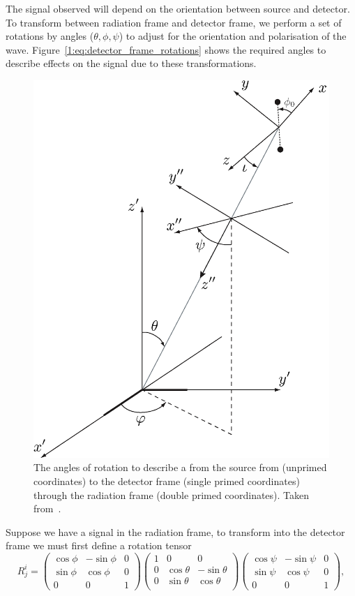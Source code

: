 The \gw signal observed will depend on the orientation between source and detector. To transform between radiation frame and detector frame, we perform a set of rotations by angles ($\theta, \phi, \psi$) to adjust for the orientation and polarisation of the wave. Figure~\ref{1:eq:detector_frame_rotations} shows the required angles to describe effects on the \gwadj signal due to these transformations.
%
\begin{figure}
    \centering
    \includegraphics[width=0.75\linewidth]{images/1_general_relativity/gravitational_wave_detection/euler.png}
    \caption{The angles of rotation to describe a \gw from the source from (unprimed coordinates) to the detector frame (single primed coordinates) through the radiation frame (double primed coordinates). Taken from~\cite{Brown_Thesis:2004}.}
    \label{1:fig:source_to_detector_frame}
\end{figure}
%
Suppose we have a \gwadj signal in the radiation frame, to transform into the detector frame we must first define a rotation tensor
%
\begin{equation}
    R^{i}_{j} = 
    \begin{pmatrix}
        \cos\phi & -\sin\phi & 0 \\
        \sin\phi &  \cos\phi & 0 \\
        0        &  0        & 1
    \end{pmatrix}
    \begin{pmatrix}
        1 & 0 & 0 \\
        0 & \cos\theta & -\sin\theta \\
        0 & \sin\theta & \cos\theta \\
    \end{pmatrix}
    \begin{pmatrix}
        \cos\psi & -\sin\psi & 0 \\
        \sin\psi &  \cos\psi & 0 \\
        0        &  0        & 1
    \end{pmatrix},
    \label{1:eq:detector_frame_rotations}
\end{equation}

